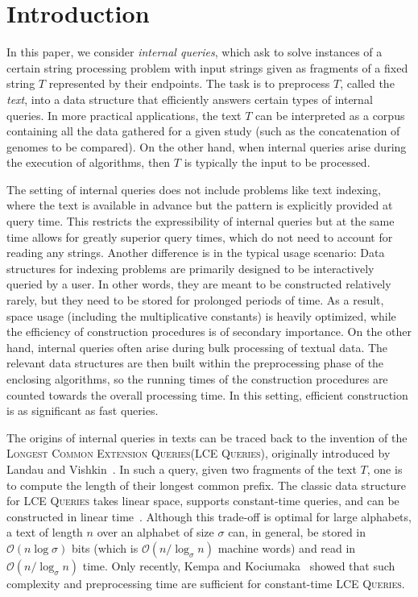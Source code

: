 \documentclass[a4paper]{article}
\theoremstyle{definition}
\theoremstyle{remark}
\newcommand{\LCEQFull}{\textsc{Longest Common Extension Queries}\xspace}
\newcommand{\LCEQ}{\textsc{LCE Queries}\xspace}
\newcommand{\Oh}{\mathcal{O}}
\begin{document}
\section{Introduction}
In this paper, we consider \emph{internal queries}, which ask to solve instances of a certain string processing problem with input strings given as fragments of a fixed string $T$ represented by their endpoints. The task is to preprocess $T$, called the \emph{text}, into a data structure that efficiently answers certain types of internal queries.
In more practical applications, the text $T$ can be interpreted as a corpus containing all the data gathered for a given study
(such as the concatenation of genomes to be compared).
On the other hand, when internal queries arise during the execution of algorithms, then $T$ is typically the input to be processed.

The setting of internal queries does not include problems like text indexing, where the text is available in advance but the pattern is explicitly provided at query time.
This restricts the expressibility of internal queries but at the same time allows for greatly superior query times, which do not need to account for reading any strings.
Another difference is in the typical usage scenario: Data structures for indexing problems are primarily designed to be interactively queried by a user.
In other words, they are meant to be constructed relatively rarely, but they need to be stored for prolonged periods of time.
As a result, space usage (including the multiplicative constants) is heavily optimized, while the efficiency of construction procedures is of secondary importance.
On the other hand, internal queries often arise during bulk processing of textual data.
The relevant data structures are then built within the preprocessing phase of the enclosing algorithms, 
so the running times of the construction procedures are counted towards the overall processing time. 
In this setting, efficient construction is as significant as fast queries. 

The origins of internal queries in texts can be traced back to the invention of the \LCEQFull (\LCEQ),
originally introduced by Landau and Vishkin~\cite{DBLP:journals/jcss/LandauV88}.
In such a query, given two fragments of the text $T$, one is to compute the length of their longest common prefix.
The classic data structure for \LCEQ takes linear space, supports constant-time queries, and can be constructed in linear time~\cite{DBLP:journals/siamcomp/HarelT84,DBLP:journals/jcss/LandauV88,DBLP:journals/jacm/Farach-ColtonFM00}.
Although this trade-off is optimal for large alphabets, a text of length $n$ over an alphabet of size $\sigma$ can, in general, be stored in $\Oh(n\log \sigma)$ bits (which is $\Oh(n / \log_\sigma n)$ machine words) and read in $\Oh(n / \log_\sigma n)$ time.
Only recently, Kempa and Kociumaka~\cite{phd,Kempa2019} showed that such complexity and preprocessing time are sufficient for constant-time \LCEQ. 
\end{document}
